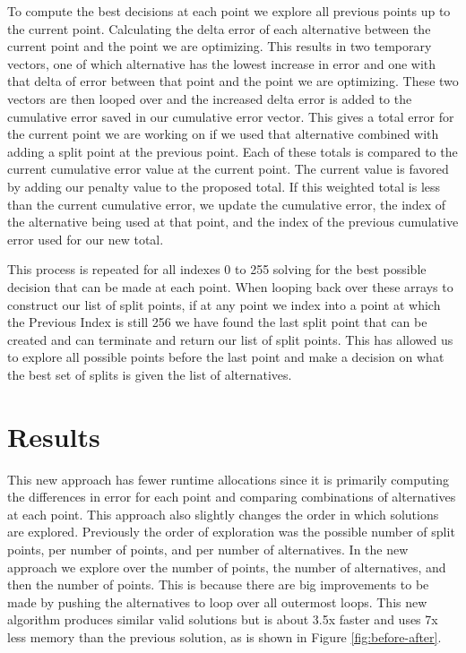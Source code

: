 \documentclass{article}
\begin{document}
To compute the best decisions at each point we explore all previous points up to the current point. Calculating the delta error of each alternative between the current point and the point we are optimizing. This results in two temporary vectors, one of which alternative has the lowest increase in error and one with that delta of error between that point and the point we are optimizing. These two vectors are then looped over and the increased delta error is added to the cumulative error saved in our cumulative error vector. This gives a total error for the current point we are working on if we used that alternative combined with adding a split point at the previous point. Each of these totals is compared to the current cumulative error value at the current point. The current value is favored by adding our penalty value to the proposed total. If this weighted total is less than the current cumulative error, we update the cumulative error, the index of the alternative being used at that point, and the index of the previous cumulative error used for our new total. 

This process is repeated for all indexes 0 to 255 solving for the best possible decision that can be made at each point. When looping back over these arrays to construct our list of split points, if at any point we index into a point at which the Previous Index is still 256 we have found the last split point that can be created and can terminate and return our list of split points. This has allowed us to explore all possible points before the last point and make a decision on what the best set of splits is given the list of alternatives.

\section{Results}

This new approach has fewer runtime allocations since it is primarily computing the differences in error for each point and comparing combinations of alternatives at each point. This approach also slightly changes the order in which solutions are explored. Previously the order of exploration was the possible number of split points, per number of points, and per number of alternatives. In the new approach we explore over the number of points, the number of alternatives, and then the number of points. This is because there are big improvements to be made by pushing the alternatives to loop over all outermost loops. This new algorithm produces similar valid solutions but is about 3.5x faster and uses 7x less memory than the previous solution, as is shown in Figure \ref{fig:before-after}.
\end{document}
